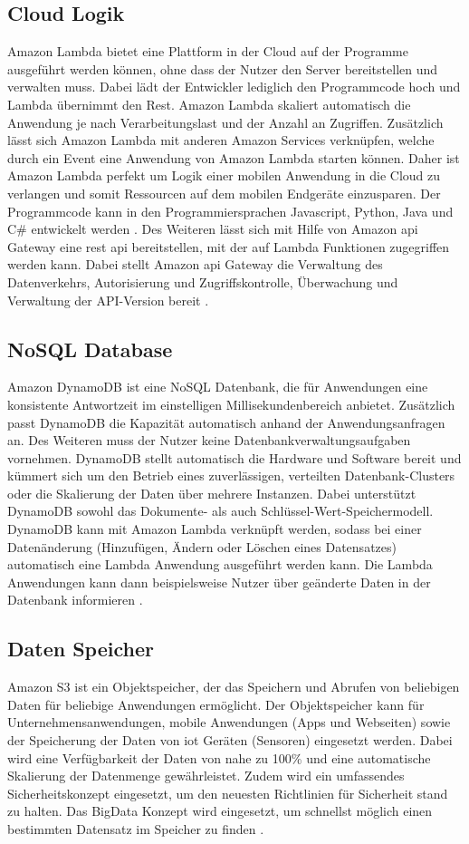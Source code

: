 \subsection{Cloud Logik}
Amazon Lambda bietet eine Plattform in der Cloud auf der Programme ausgeführt werden können, ohne dass der Nutzer den Server bereitstellen und verwalten muss. Dabei lädt der Entwickler lediglich den Programmcode hoch und Lambda übernimmt den Rest. Amazon Lambda skaliert automatisch die Anwendung je nach Verarbeitungslast und der Anzahl an Zugriffen. Zusätzlich lässt sich Amazon Lambda mit anderen Amazon Services verknüpfen, welche durch ein Event eine Anwendung von Amazon Lambda starten können. Daher ist Amazon Lambda perfekt um Logik einer mobilen Anwendung in die Cloud zu verlangen und somit Ressourcen auf dem mobilen Endgeräte einzusparen. Der Programmcode kann in den Programmiersprachen Javascript, Python, Java und C\# entwickelt werden \cite{AmazonLambda}. Des Weiteren lässt sich mit Hilfe von Amazon \gls{api} Gateway eine \gls{rest} \gls{api} bereitstellen, mit der auf Lambda Funktionen zugegriffen werden kann. Dabei stellt Amazon \gls{api} Gateway die Verwaltung des Datenverkehrs, Autorisierung und Zugriffskontrolle, Überwachung und Verwaltung der API-Version bereit \cite{AmazonAPIGateway}.

\subsection{NoSQL Database}
Amazon DynamoDB ist eine NoSQL Datenbank, die für Anwendungen eine konsistente Antwortzeit im einstelligen Millisekundenbereich anbietet. Zusätzlich passt DynamoDB die Kapazität automatisch anhand der Anwendungsanfragen an. Des Weiteren muss der Nutzer keine Datenbankverwaltungsaufgaben vornehmen. DynamoDB stellt automatisch die Hardware und Software bereit und kümmert sich um den Betrieb eines zuverlässigen, verteilten Datenbank-Clusters oder die Skalierung der Daten über mehrere Instanzen. Dabei unterstützt DynamoDB sowohl das Dokumente- als auch Schlüssel-Wert-Speichermodell. DynamoDB kann mit Amazon Lambda verknüpft werden, sodass bei einer Datenänderung (Hinzufügen, Ändern oder Löschen eines Datensatzes) automatisch eine Lambda Anwendung ausgeführt werden kann. Die Lambda Anwendungen kann dann beispielsweise Nutzer über geänderte Daten in der Datenbank informieren \cite{AmazonDynamoDB}. 

\subsection{Daten Speicher}
Amazon S3 ist ein Objektspeicher, der das Speichern und Abrufen von beliebigen Daten für beliebige Anwendungen ermöglicht. Der Objektspeicher kann für Unternehmensanwendungen, mobile Anwendungen (Apps und Webseiten) sowie der Speicherung der Daten von \acs{iot} Geräten (Sensoren) eingesetzt werden. Dabei wird eine Verfügbarkeit der Daten von nahe zu 100\% und eine automatische Skalierung der Datenmenge gewährleistet. Zudem wird ein umfassendes Sicherheitskonzept eingesetzt, um den neuesten Richtlinien für Sicherheit stand zu halten. Das BigData Konzept wird eingesetzt, um schnellst möglich einen bestimmten Datensatz im Speicher zu finden \cite{AmazonE3}.

